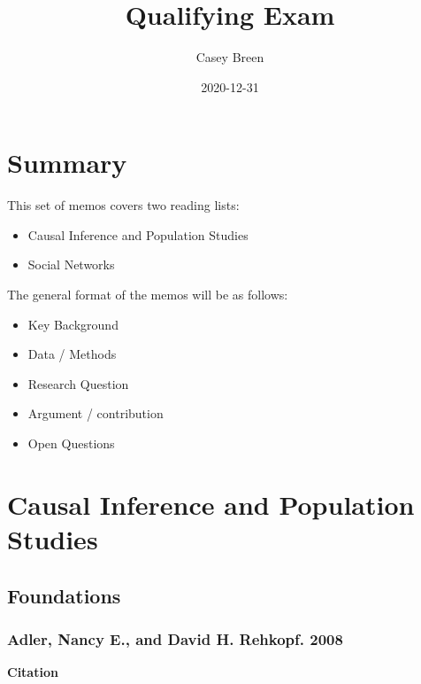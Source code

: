 \documentclass[
]{book}
\title{Qualifying Exam}
\author{Casey Breen}
\date{2020-12-31}
\providecommand{\tightlist}{%
  \setlength{\itemsep}{0pt}\setlength{\parskip}{0pt}}
\begin{document}
\maketitle

{
\setcounter{tocdepth}{1}
\tableofcontents
}
\hypertarget{summary}{%
\chapter{Summary}\label{summary}}

This set of memos covers two reading lists:

\begin{itemize}
\tightlist
\item
  Causal Inference and Population Studies
\item
  Social Networks
\end{itemize}

The general format of the memos will be as follows:

\begin{itemize}
\item
  Key Background
\item
  Data / Methods
\item
  Research Question
\item
  Argument / contribution
\item
  Open Questions
\end{itemize}

\hypertarget{causal-inference-and-population-studies}{%
\chapter{Causal Inference and Population Studies}\label{causal-inference-and-population-studies}}

\hypertarget{foundations}{%
\section{Foundations}\label{foundations}}

\hypertarget{adler-nancy-e.-and-david-h.-rehkopf.-2008}{%
\subsection*{Adler, Nancy E., and David H. Rehkopf. 2008}\label{adler-nancy-e.-and-david-h.-rehkopf.-2008}}

\textbf{Citation}
\end{document}
